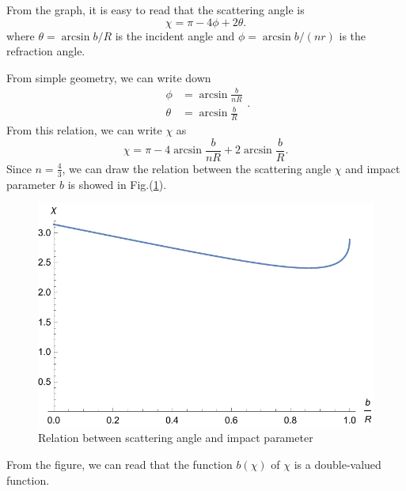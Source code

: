 \documentclass[%
 reprint,
 amsmath,amssymb,
 aps,
]{revtex4-1}
\begin{document}
From the graph, it is easy to read that the scattering angle is
\begin{equation}
    \chi=\pi-4\phi+2\theta.
\end{equation}
where $\theta=\arcsin{b/R}$ is the incident angle and $\phi=\arcsin{b/(nr)}$ is the refraction angle.

From simple geometry, we can write down
\begin{equation}
\begin{aligned}
\phi&=\arcsin{\frac{b}{nR}}\\
\theta&=\arcsin{\frac{b}{R}}
\end{aligned}.
\end{equation}
From this relation, we can write $\chi$ as
\begin{equation}
    \chi=\pi-4\arcsin{\frac{b}{nR}}+2\arcsin{\frac{b}{R}}.
\label{scatteringangle}
\end{equation}
Since $n=\frac{4}{3}$, we can draw the relation between the scattering angle $\chi$ and impact parameter $b$ is showed in Fig.(\ref{chiandb}).
\begin{figure}
    \centering
    \includegraphics[scale=0.6]{scatteringanglevsb.pdf}
    \caption{Relation between scattering angle and impact parameter}
    \label{chiandb}
\end{figure}
From the figure, we can read that the function $b(\chi)$ of $\chi$ is a double-valued function.
\end{document}
